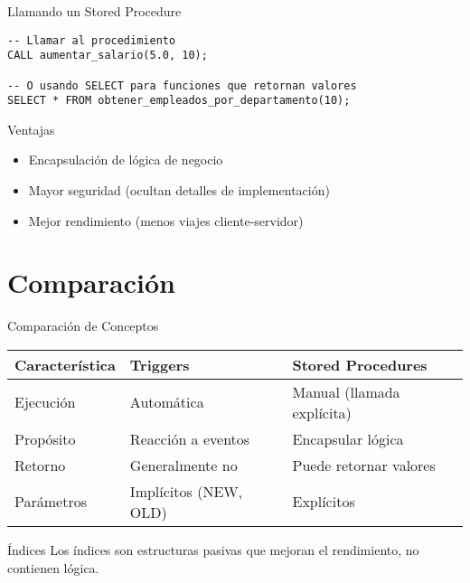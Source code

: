 \documentclass{beamer}
\begin{document}
\begin{frame}[fragile]{Llamando un Stored Procedure}
\begin{lstlisting}
-- Llamar al procedimiento
CALL aumentar_salario(5.0, 10);

-- O usando SELECT para funciones que retornan valores
SELECT * FROM obtener_empleados_por_departamento(10);
\end{lstlisting}

\begin{block}{Ventajas}
\begin{itemize}
\item Encapsulación de lógica de negocio
\item Mayor seguridad (ocultan detalles de implementación)
\item Mejor rendimiento (menos viajes cliente-servidor)
\end{itemize}
\end{block}
\end{frame}

\section{Comparación}
\begin{frame}{Comparación de Conceptos}
\begin{table}
\centering
\begin{tabular}{|l|l|l|}
\hline
\textbf{Característica} & \textbf{Triggers} & \textbf{Stored Procedures} \\
\hline
Ejecución & Automática & Manual (llamada explícita) \\
\hline
Propósito & Reacción a eventos & Encapsular lógica \\
\hline
Retorno & Generalmente no & Puede retornar valores \\
\hline
Parámetros & Implícitos (NEW, OLD) & Explícitos \\
\hline
\end{tabular}
\end{table}

\begin{block}{Índices}
Los índices son estructuras pasivas que mejoran el rendimiento, no contienen lógica.
\end{block}
\end{frame}
\end{document}
